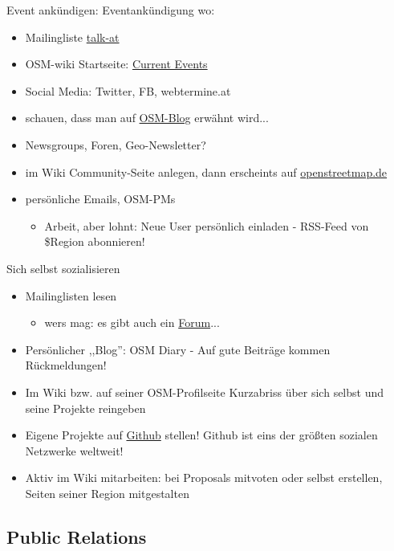 \documentclass{beamer}
\begin{document}
\begin{frame}{Event ankündigen:}
	Eventankündigung wo:
	\begin{itemize}
		\item Mailingliste \href{http://lists.openstreetmap.org/listinfo/talk-at}{talk-at}
		\item OSM-wiki Startseite: \href{http://wiki.openstreetmap.org/wiki/Current\_events}{Current Events}
		\item Social Media: Twitter, FB, webtermine.at
		\item schauen, dass man auf \href{http://blog.openstreetmap.de/}{OSM-Blog} erwähnt wird...
		\item Newsgroups, Foren, Geo-Newsletter?
		\item im Wiki Community-Seite anlegen, dann erscheints auf \href{http://openstreetmap.de}{openstreetmap.de}
		\item persönliche Emails, OSM-PMs
		\begin{itemize}
			\item  Arbeit, aber lohnt: Neue User persönlich einladen - RSS-Feed von \$Region abonnieren!
		\end{itemize}
	\end{itemize}
\end{frame}

\begin{frame}{Sich selbst sozialisieren}
	
	\begin{itemize}
		\item Mailinglisten lesen
		\begin{itemize}
			\item wers mag: es gibt auch ein \href{http://forum.openstreetmap.org/viewforum.php?id=14}{Forum}...
		\end{itemize}
		\item Persönlicher ,,Blog'': OSM Diary - Auf gute Beiträge kommen Rückmeldungen!
		\item Im Wiki bzw. auf seiner OSM-Profilseite Kurzabriss über sich selbst und seine Projekte reingeben
		\item Eigene Projekte auf \href{http://github.com}{Github} stellen! Github ist eins der größten sozialen Netzwerke weltweit!
		\item Aktiv im Wiki mitarbeiten: bei Proposals mitvoten oder selbst erstellen, Seiten seiner Region mitgestalten
	\end{itemize}
\end{frame}

\subsection{Public Relations}
\end{document}

